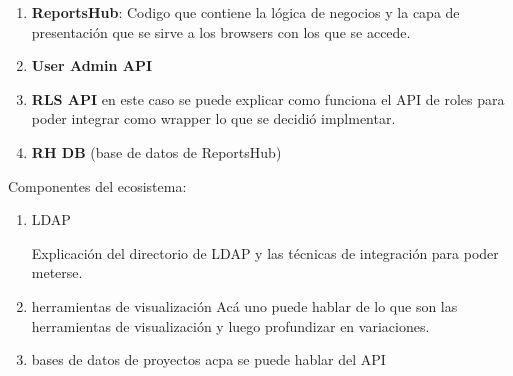 \begin{enumerate}
    \item \textbf{ReportsHub}:
        Codigo que contiene la lógica de negocios y la capa de presentación que se sirve a los browsers con los que se accede.
    \item \textbf{User Admin API}
    
    
    \item \textbf{RLS API}
    en este caso se puede explicar como funciona el API de roles para poder integrar como wrapper lo que se decidió implmentar.
    \item \textbf{RH DB} (base de datos de ReportsHub)
\end{enumerate}

Componentes del ecosistema:

\begin{enumerate}
    \item LDAP

    Explicación del directorio de LDAP y las técnicas de integración para poder meterse.
    
    \item herramientas de visualización
    Acá uno puede hablar de lo que son las herramientas de visualización y luego profundizar en variaciones.
    
    \item bases de datos de proyectos
    acpa se puede hablar del API

    
\end{enumerate}


\vspace{1cm}

